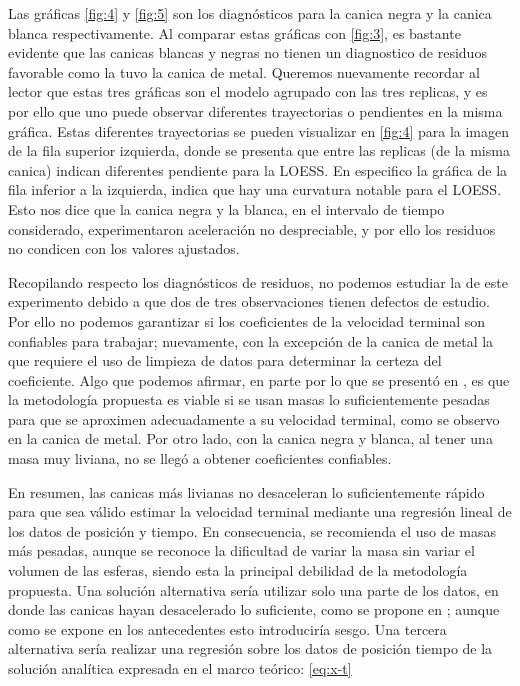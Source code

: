 \documentclass[12pt,a4paper]{config/myConfig}
\begin{document}
\indent Las gráficas \cref{fig:4} y \cref{fig:5} son los diagnósticos para la canica negra y la canica blanca respectivamente. Al comparar estas gráficas con \cref{fig:3}, es bastante evidente que las canicas blancas y negras no tienen un diagnostico de residuos favorable como la tuvo la canica de metal. Queremos nuevamente recordar al lector que estas tres gráficas son el modelo agrupado con las tres replicas, y es por ello que uno puede observar diferentes trayectorias o pendientes en la misma gráfica. Estas diferentes trayectorias se pueden visualizar en \cref{fig:4} para la imagen de la fila superior izquierda, donde se presenta que entre las replicas (de la misma canica) indican diferentes pendiente para la LOESS. En especifico la gráfica de la fila inferior a la izquierda, indica que hay una curvatura notable para el LOESS. Esto nos dice que la canica negra y la blanca, en el intervalo de tiempo considerado, experimentaron aceleración no despreciable, y por ello los residuos no condicen con los valores ajustados.\newline

Recopilando respecto los diagnósticos de residuos, no podemos estudiar la  de este experimento debido a que dos de tres observaciones tienen defectos de estudio. Por ello no podemos garantizar si los coeficientes de la velocidad terminal son confiables para trabajar; nuevamente, con la excepción de la canica de metal la que requiere el uso de limpieza de datos para determinar la certeza del coeficiente. Algo que podemos afirmar, en parte por lo que se presentó en , es que la metodología propuesta es viable si se usan masas lo suficientemente pesadas para que se aproximen adecuadamente a su velocidad terminal, como se observo en la canica de metal. Por otro lado, con la canica negra y blanca, al tener una masa muy liviana, no se llegó a obtener coeficientes confiables.

En resumen, las canicas más livianas no desaceleran lo suficientemente rápido para que sea válido estimar la velocidad terminal mediante una regresión lineal de los datos de posición y tiempo. En consecuencia, se recomienda el uso de masas más pesadas, aunque se reconoce la dificultad de variar la masa sin variar el volumen de las esferas, siendo esta la principal debilidad de la metodología propuesta. Una solución alternativa sería utilizar solo una parte de los datos, en donde las canicas hayan desacelerado lo suficiente, como se propone en \citet{gluck2003air}; aunque como se expone en los antecedentes esto introduciría sesgo. Una tercera alternativa sería realizar una regresión sobre los datos de posición tiempo de la solución analítica expresada en el marco teórico: \eqref{eq:x-t}
\end{document}
